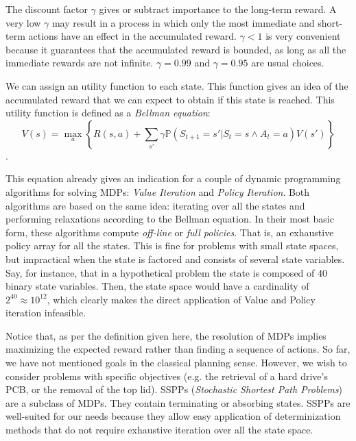 \documentclass[../root.tex]{subfiles}
\begin{document}
The discount factor $ \gamma $ gives or subtract importance
to the long-term reward. A very low $ \gamma $ may result in a process in which
only the most immediate and short-term actions have an effect in the
accumulated reward. $ \gamma < 1 $ is very convenient because it guarantees
that the accumulated reward is bounded, as long as all the immediate rewards
are not infinite. $ \gamma = 0.99 $ and $ \gamma = 0.95 $ are usual choices.

We can assign an utility function to each state. This function gives an
idea of the accumulated reward that we can expect to obtain if this state
is reached. This utility function is defined as a \emph{Bellman equation}:
\[ V(s) = \max_a \left\{  R(s, a) + \sum_{s'} \gamma \mathbb{P}(S_{t+1} = s' | S_t = s \land A_t=a) V(s') \right\} \].

This equation already gives an indication for a couple of dynamic programming
algorithms for solving MDPs: \emph{Value Iteration} and \emph{Policy Iteration}.
Both algorithms are based on the same idea: iterating over all the states and
performing relaxations according to the Bellman equation. In their most
basic form, these algorithms compute \emph{off-line} or \emph{full policies}.
That is, an exhaustive policy array for all the states. This is
fine for problems with small state spaces, but impractical when the state
is factored and consists of several state variables. Say, for instance, that
in a hypothetical problem the state is composed of 40 binary state variables.
Then, the state space would have a cardinality of $ 2^{40} \approx 10^{12} $, which
clearly makes the direct application of Value and Policy iteration
infeasible.

Notice that, as per the definition given here, the resolution of MDPs
implies maximizing the expected reward rather than finding a sequence of actions.
So far, we have not mentioned goals in the classical planning sense.
However, we wish to consider
problems with specific objectives (e.g. the retrieval of a hard drive's PCB,
or the removal of the top lid). SSPPs (\emph{Stochastic Shortest Path Problems})
are a subclass of MDPs. They contain terminating or absorbing states.
SSPPs
are well-suited for our needs because they allow easy application of determinization
methods that do not require exhaustive iteration over all the state space.
\end{document}
